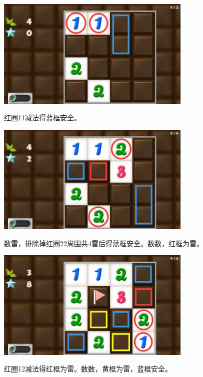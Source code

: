\subsection{} %
\begin{center}
    \includegraphics[width=0.7\textwidth]{puzzlelow/118-1.jpg}
\end{center}
红圈11减法得蓝框安全。
\begin{center}
    \includegraphics[width=0.7\textwidth]{puzzlelow/118-2.jpg}
\end{center}
数雷，排除掉红圈22周围共4雷后得蓝框安全。数数，红框为雷。
\begin{center}
    \includegraphics[width=0.7\textwidth]{puzzlelow/118-3.jpg}
\end{center}
红圈12减法得红框为雷。数数，黄框为雷，蓝框安全。

